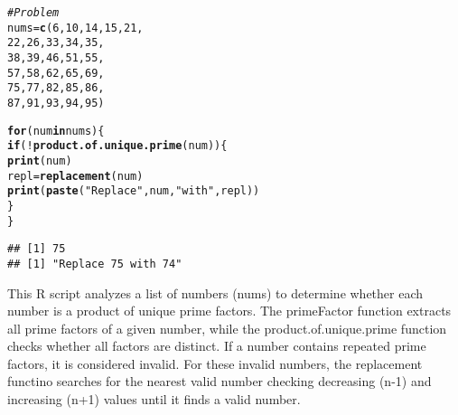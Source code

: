 \documentclass{article}\usepackage[]{graphicx}\usepackage[]{xcolor}
\makeatletter
\newcommand{\hlnum}[1]{\textcolor[rgb]{0.686,0.059,0.569}{#1}}%
\newcommand{\hlsng}[1]{\textcolor[rgb]{0.192,0.494,0.8}{#1}}%
\newcommand{\hlcom}[1]{\textcolor[rgb]{0.678,0.584,0.686}{\textit{#1}}}%
\newcommand{\hlopt}[1]{\textcolor[rgb]{0,0,0}{#1}}%
\newcommand{\hldef}[1]{\textcolor[rgb]{0.345,0.345,0.345}{#1}}%
\newcommand{\hlkwa}[1]{\textcolor[rgb]{0.161,0.373,0.58}{\textbf{#1}}}%
\newcommand{\hlkwb}[1]{\textcolor[rgb]{0.69,0.353,0.396}{#1}}%
\newcommand{\hlkwd}[1]{\textcolor[rgb]{0.737,0.353,0.396}{\textbf{#1}}}%
\newenvironment{kframe}{%
 \def\at@end@of@kframe{}%
 \ifinner\ifhmode%
  \def\at@end@of@kframe{\end{minipage}}%
  \begin{minipage}{\columnwidth}%
 \fi\fi%
 \def\FrameCommand##1{\hskip\@totalleftmargin \hskip-\fboxsep
 \colorbox{shadecolor}{##1}\hskip-\fboxsep
     \hskip-\linewidth \hskip-\@totalleftmargin \hskip\columnwidth}%
 \MakeFramed {\advance\hsize-\width
   \@totalleftmargin\z@ \linewidth\hsize
   \@setminipage}}%
 {\par\unskip\endMakeFramed%
 \at@end@of@kframe}
\newenvironment{knitrout}{}{} %
\makeatother
\begin{document}
\begin{enumerate}
\begin{knitrout}
\begin{kframe}
\begin{alltt}
\hlcom{# Problem}
\hldef{nums} \hlkwb{=} \hlkwd{c}\hldef{(}\hlnum{6}\hldef{,} \hlnum{10}\hldef{,} \hlnum{14}\hldef{,} \hlnum{15}\hldef{,} \hlnum{21}\hldef{,}
         \hlnum{22}\hldef{,} \hlnum{26}\hldef{,} \hlnum{33}\hldef{,} \hlnum{34}\hldef{,} \hlnum{35}\hldef{,}
         \hlnum{38}\hldef{,} \hlnum{39}\hldef{,} \hlnum{46}\hldef{,} \hlnum{51}\hldef{,} \hlnum{55}\hldef{,}
         \hlnum{57}\hldef{,} \hlnum{58}\hldef{,} \hlnum{62}\hldef{,} \hlnum{65}\hldef{,} \hlnum{69}\hldef{,}
         \hlnum{75}\hldef{,} \hlnum{77}\hldef{,} \hlnum{82}\hldef{,} \hlnum{85}\hldef{,} \hlnum{86}\hldef{,}
         \hlnum{87}\hldef{,} \hlnum{91}\hldef{,} \hlnum{93}\hldef{,} \hlnum{94}\hldef{,} \hlnum{95}\hldef{)}

\hlkwa{for} \hldef{(num} \hlkwa{in} \hldef{nums) \{}
  \hlkwa{if} \hldef{(}\hlopt{!}\hlkwd{product.of.unique.prime}\hldef{(num))\{}
    \hlkwd{print}\hldef{(num)}
    \hldef{repl} \hlkwb{=} \hlkwd{replacement}\hldef{(num)}
    \hlkwd{print}\hldef{(}\hlkwd{paste}\hldef{(}\hlsng{"Replace"}\hldef{, num,} \hlsng{"with"}\hldef{, repl))}
  \hldef{\}}
\hldef{\}}
\end{alltt}
\begin{verbatim}
## [1] 75
## [1] "Replace 75 with 74"
\end{verbatim}
\end{kframe}
\end{knitrout}

This R script analyzes a list of numbers (nums) to determine whether each number is a product of unique prime factors. The primeFactor function extracts all prime factors of a given number, while the product.of.unique.prime function checks whether all factors are distinct. If a number contains repeated prime factors, it is considered invalid. For these invalid numbers, the replacement functino searches for the nearest valid number checking decreasing (n-1) and increasing (n+1) values until it finds a valid number.  

\end{enumerate}


\end{document}
